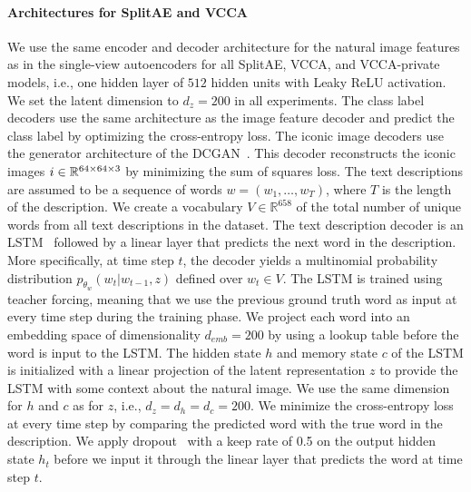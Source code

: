 \vspace{-3mm}
\paragraph{Architectures for SplitAE and VCCA} We use the same encoder and decoder architecture for the natural image features as in the single-view autoencoders for all SplitAE, VCCA, and VCCA-private models, i.e., one hidden layer of $512$ hidden units with Leaky ReLU activation. We set the latent dimension to $d_{z} = 200$ in all experiments. The class label decoders use the same architecture as the image feature decoder and predict the class label by optimizing the cross-entropy loss. The iconic image decoders use the generator architecture of the DCGAN~. This decoder reconstructs the iconic images $i \in \mathbb{R}^{64 \times 64 \times 3}$ by minimizing the sum of squares loss. The text descriptions are assumed to be a sequence of words $w = (w_1, \dots, w_T)$, where $T$ is the length of the description. We create a vocabulary $V \in \mathbb{R}^{658}$ of the total number of unique words from all text descriptions in the dataset. The text description decoder is an LSTM~ followed by a linear layer that predicts the next word in the description. More specifically, at time step $t$, the decoder yields a multinomial probability distribution $p_{{\theta_{w}}}(w_t | w_{t-1}, z)$ defined over $w_t \in V$. The LSTM is trained using teacher forcing, meaning that we use the previous ground truth word as input at every time step during the training phase. We project each word into an embedding space of dimensionality $d_{emb} = 200$ by using a lookup table before the word is input to the LSTM. The hidden state $h$ and memory state $c$ of the LSTM is initialized with a linear projection of the latent representation $z$ to provide the LSTM with some context about the natural image. We use the same dimension for $h$ and $c$ as for $z$, i.e., $d_{z} = d_{h} = d_{c} = 200$. We minimize the cross-entropy loss at every time step by comparing the predicted word with the true word in the description. We apply dropout~ with a keep rate of 0.5 on the output hidden state $h_t$ before we input it through the linear layer that predicts the word at time step $t$. 

\vspace{-3mm}

